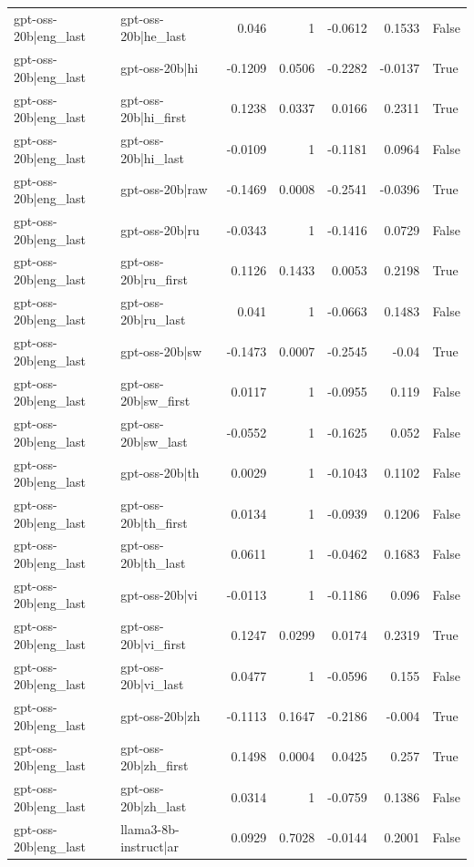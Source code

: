\begin{table}
\begin{tabular}{l l r r r r l}
gpt-oss-20b|eng_last & gpt-oss-20b|he_last & 0.046 & 1 & -0.0612 & 0.1533 & False \\
gpt-oss-20b|eng_last & gpt-oss-20b|hi & -0.1209 & 0.0506 & -0.2282 & -0.0137 & True \\
gpt-oss-20b|eng_last & gpt-oss-20b|hi_first & 0.1238 & 0.0337 & 0.0166 & 0.2311 & True \\
gpt-oss-20b|eng_last & gpt-oss-20b|hi_last & -0.0109 & 1 & -0.1181 & 0.0964 & False \\
gpt-oss-20b|eng_last & gpt-oss-20b|raw & -0.1469 & 0.0008 & -0.2541 & -0.0396 & True \\
gpt-oss-20b|eng_last & gpt-oss-20b|ru & -0.0343 & 1 & -0.1416 & 0.0729 & False \\
gpt-oss-20b|eng_last & gpt-oss-20b|ru_first & 0.1126 & 0.1433 & 0.0053 & 0.2198 & True \\
gpt-oss-20b|eng_last & gpt-oss-20b|ru_last & 0.041 & 1 & -0.0663 & 0.1483 & False \\
gpt-oss-20b|eng_last & gpt-oss-20b|sw & -0.1473 & 0.0007 & -0.2545 & -0.04 & True \\
gpt-oss-20b|eng_last & gpt-oss-20b|sw_first & 0.0117 & 1 & -0.0955 & 0.119 & False \\
gpt-oss-20b|eng_last & gpt-oss-20b|sw_last & -0.0552 & 1 & -0.1625 & 0.052 & False \\
gpt-oss-20b|eng_last & gpt-oss-20b|th & 0.0029 & 1 & -0.1043 & 0.1102 & False \\
gpt-oss-20b|eng_last & gpt-oss-20b|th_first & 0.0134 & 1 & -0.0939 & 0.1206 & False \\
gpt-oss-20b|eng_last & gpt-oss-20b|th_last & 0.0611 & 1 & -0.0462 & 0.1683 & False \\
gpt-oss-20b|eng_last & gpt-oss-20b|vi & -0.0113 & 1 & -0.1186 & 0.096 & False \\
gpt-oss-20b|eng_last & gpt-oss-20b|vi_first & 0.1247 & 0.0299 & 0.0174 & 0.2319 & True \\
gpt-oss-20b|eng_last & gpt-oss-20b|vi_last & 0.0477 & 1 & -0.0596 & 0.155 & False \\
gpt-oss-20b|eng_last & gpt-oss-20b|zh & -0.1113 & 0.1647 & -0.2186 & -0.004 & True \\
gpt-oss-20b|eng_last & gpt-oss-20b|zh_first & 0.1498 & 0.0004 & 0.0425 & 0.257 & True \\
gpt-oss-20b|eng_last & gpt-oss-20b|zh_last & 0.0314 & 1 & -0.0759 & 0.1386 & False \\
gpt-oss-20b|eng_last & llama3-8b-instruct|ar & 0.0929 & 0.7028 & -0.0144 & 0.2001 & False \\

\end{tabular}
\end{table}
